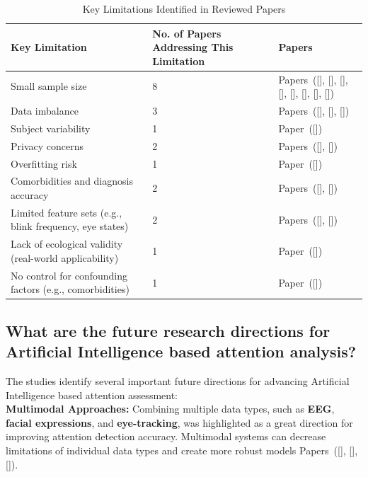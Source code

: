 \documentclass[12pt]{article}
\begin{document}
\begin{table}[H]
\centering
\caption{Key Limitations Identified in Reviewed Papers}
\begin{tabular}{|p{}|p{}|p{}|}
\hline
\textbf{Key Limitation} & \textbf{No. of Papers Addressing This Limitation} & \textbf{Papers} \\
\hline
Small sample size & 8 & Papers~([\citealp{ref2}], [\citealp{ref3}], [\citealp{ref4}], [\citealp{ref7}], [\citealp{ref10}], [\citealp{ref12}], [\citealp{ref14}], [\citealp{ref15}]) \\
\hline
Data imbalance & 3 & Papers~([\citealp{ref9}], [\citealp{ref11}], [\citealp{ref13}]) \\
\hline
Subject variability & 1 & Paper~([\citealp{ref3}]) \\
\hline
Privacy concerns & 2 & Papers~([\citealp{ref6}], [\citealp{ref8}]) \\
\hline
Overfitting risk & 1 & Paper~([\citealp{ref13}]) \\
\hline
Comorbidities and diagnosis accuracy & 2 & Papers~([\citealp{ref5}], [\citealp{ref15}]) \\
\hline
Limited feature sets (e.g., blink frequency, eye states) & 2 & Papers~([\citealp{ref7}], [\citealp{ref8}]) \\
\hline
Lack of ecological validity (real-world applicability) & 1 & Paper~([\citealp{ref16}]) \\
\hline
No control for confounding factors (e.g., comorbidities) & 1 & Paper~([\citealp{ref15}]) \\
\hline
\end{tabular}
\end{table}

\subsection{ What are the future research directions for Artificial Intelligence based attention analysis?} 

The studies identify several important future directions for advancing Artificial Intelligence based attention assessment: \\

\textbullet \textbf{Multimodal Approaches:} Combining multiple data types, such as \textbf{EEG}, \textbf{facial expressions}, and \textbf{eye-tracking}, was highlighted as a great direction for improving attention detection accuracy. Multimodal systems can decrease limitations of individual data types and create more robust models Papers~([\citealp{ref1}], [\citealp{ref7}], [\citealp{ref8}]). \\ 
\end{document}
